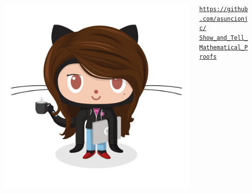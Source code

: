 \documentclass[11pt,a4paper,xcolor=dvipsnames, leqno]{beamer}
\begin{document}
\begin{frame}
\begin{columns}
\begin{column}{0.5\textwidth}
\begin{flushright}
\href{https://github.com/asuncionjc}{\includegraphics[scale=0.12]{github_girl.png}}
\end{flushright}
\end{column}
\begin{column}{1\textwidth}
\begin{flushleft}
\small
\href{https://github.com/asuncionjc/Show_and_Tell_Mathematical_Proofs}{\tt https://github.com/asuncionjc/\\
Show\_and\_Tell\_Mathematical\_Proofs}
\end{flushleft}
\end{column}
\end{columns}
\begin{center}
\end{center}
\end{frame}
\end{document}
